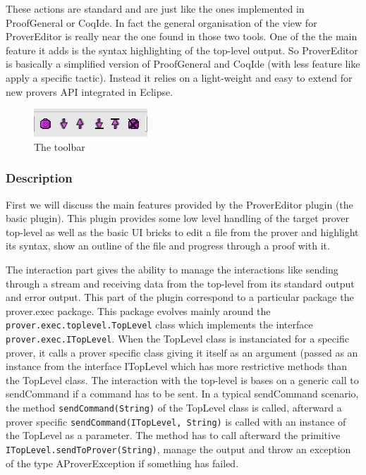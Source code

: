 \documentclass{entcs}
\begin{document}
These actions are standard and are just like the ones implemented in 
ProofGeneral
or CoqIde. In fact the general organisation of the view for ProverEditor is 
really near the one found in those two tools. One of the the main feature 
it adds is the syntax highlighting of the top-level output. 
So ProverEditor is basically a simplified version of ProofGeneral 
and CoqIde (with less feature like apply a specific tactic).
Instead it relies on a light-weight and easy to extend for 
new provers API integrated in Eclipse.

\begin{figure}
\begin{center}
\includegraphics[width=0.3\linewidth]{toolbar}
\end{center}
  \caption{The toolbar}
  \label{tb}
\end{figure}

\subsubsection{Description}
\label{subsubsec:description}

First we will discuss the main features provided by the ProverEditor plugin
(the basic plugin). This plugin provides some low level handling of the target
prover top-level as well as the basic UI bricks to edit a file from the 
prover and highlight its syntax, show an outline of the file and
progress through a proof with it.

The interaction part gives the ability to manage the interactions like sending
through a stream and receiving data from the top-level from its standard output
and error output.
This part of the plugin correspond to a particular package the 
prover.exec package.
This package evolves mainly around the \\
{\tt prover.exec.toplevel.TopLevel} class
which implements the interface {\tt prover.exec.ITopLevel}. 
When the TopLevel class
is instanciated for a specific prover, it calls a prover specific class giving 
it itself as an argument (passed as an instance from the interface
ITopLevel which has more restrictive methods than the TopLevel class.
The interaction with the top-level is bases on a generic call to sendCommand
if a command has to be sent. In a typical sendCommand scenario, the method
{\tt sendCommand(String)} of the TopLevel class is called, 
afterward a prover specific 
{\tt sendCommand(ITopLevel, String)} is called with an instance of the 
TopLevel as a parameter. The method has to call afterward the primitive
{\tt ITopLevel.sendToProver(String)}, manage the output and throw an 
exception of the type AProverException if something has failed.
\end{document}
